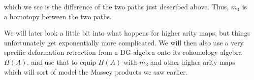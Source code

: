 which we see is the difference of the two paths just described above. Thus, $m_4$ is a homotopy between the two paths. 

We will later look a little bit into what happens for higher arity maps, but things unfortunately get exponentially more complicated. We will then also use a very specific deformation retraction from a DG-algebra onto its cohomology algebra $H(A)$, and use that to equip $H(A)$ with $m_3$ and other higher arity maps which will sort of model the Massey products we saw earlier.  
